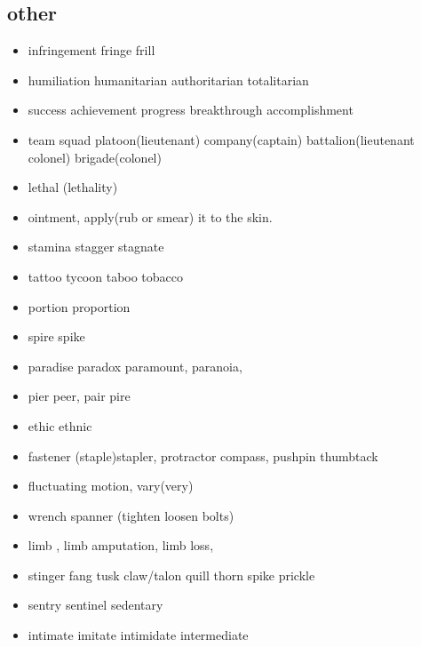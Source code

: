 \documentclass[a4paper,11pt,twoside]{book}
\begin{document}
\subsection{other}
\begin{itemize}
	\item infringement fringe frill
	
	\item humiliation humanitarian authoritarian totalitarian 
	
	\item success achievement progress breakthrough accomplishment
	
	\item team squad platoon(lieutenant) company(captain) battalion(lieutenant colonel) brigade(colonel)
	
	\item lethal (lethality) 
	
	\item ointment, apply(rub or smear) it to the skin. 
	
	\item stamina stagger stagnate
	
	\item tattoo tycoon taboo tobacco 
	
	\item portion proportion
	
	\item spire spike
	
	
	\item paradise paradox paramount, paranoia, 
	
	\item pier peer,  pair pire
	
	\item ethic ethnic
	
	\item fastener (staple)stapler, protractor compass, pushpin thumbtack 
	
	\item fluctuating motion, vary(very)
	
	\item wrench spanner (tighten loosen bolts)
	
	\item limb , limb amputation, limb loss, 
	
	\item stinger fang tusk claw/talon quill thorn spike prickle
	
	\item sentry sentinel sedentary 
	
	\item intimate imitate intimidate intermediate  
	
\end{itemize}
	
\end{document}
